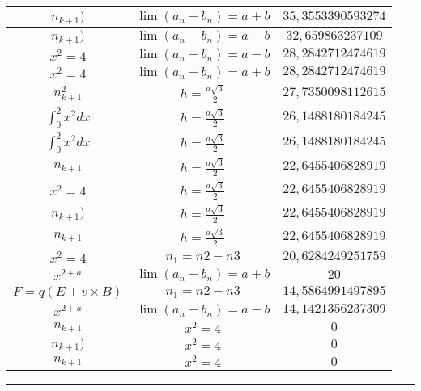 \documentclass{article}
\begin{document}
\begin{flushleft}
\begin{longtable}{|c|c|c|}
$n_{k+1})$ & $\lim\left(a_n+b_n\right)=a+b$ & $35,3553390593274$ \\ \hline 
$n_{k+1})$ & $\lim\left(a_n-b_n\right)=a-b$ & $32,659863237109$ \\ \hline 
$x^2=4$ & $\lim\left(a_n-b_n\right)=a-b$ & $28,2842712474619$ \\ \hline 
$x^2=4$ & $\lim\left(a_n+b_n\right)=a+b$ & $28,2842712474619$ \\ \hline 
$n_{k+1}^2$ & $h=\frac{a\sqrt{3}}{2}$ & $27,7350098112615$ \\ \hline 
$\int _0^2x^2dx$ & $h=\frac{a\sqrt{3}}{2}$ & $26,1488180184245$ \\ \hline 
$\int _0^2x^2dx$ & $h=\frac{a\sqrt{3}}{2}$ & $26,1488180184245$ \\ \hline 
$n_{k+1}$ & $h=\frac{a\sqrt{3}}{2}$ & $22,6455406828919$ \\ \hline 
$x^2=4$ & $h=\frac{a\sqrt{3}}{2}$ & $22,6455406828919$ \\ \hline 
$n_{k+1})$ & $h=\frac{a\sqrt{3}}{2}$ & $22,6455406828919$ \\ \hline 
$n_{k+1}$ & $h=\frac{a\sqrt{3}}{2}$ & $22,6455406828919$ \\ \hline 
$x^2=4$ & $n_{1}={n{2}-n{3}}$ & $20,6284249251759$ \\ \hline 
$x^{2+a}$ & $\lim\left(a_n+b_n\right)=a+b$ & $20$ \\ \hline 
$F=q\left(E+v\times B\right)$ & $n_{1}={n{2}-n{3}}$ & $14,5864991497895$ \\ \hline 
$x^{2+a}$ & $\lim\left(a_n-b_n\right)=a-b$ & $14,1421356237309$ \\ \hline 
$n_{k+1}$ & $x^2=4$ & $0$ \\ \hline 
$n_{k+1})$ & $x^2=4$ & $0$ \\ \hline 
$n_{k+1}$ & $x^2=4$ & $0$ \\ \hline 
\end{longtable} 

\end{flushleft}
\hrule
\end{document}

